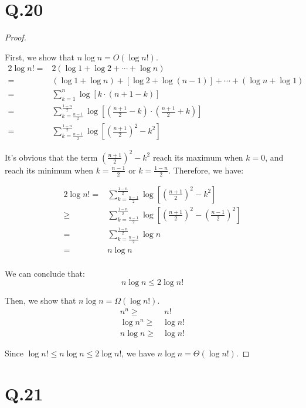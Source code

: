 \documentclass[a4paper,12pt]{article}
\begin{document}
\section*{Q.20}
\begin{proof}
$ $

First, we show that $n \log n = O(\log n!)$.
\begin{align*}
	2 \log n! =& 2(\log 1 + \log 2 + \cdots + \log n)\\
	=& (\log 1 + \log n) + [\log 2 + \log (n-1)] + \cdots + (\log n + \log 1)\\
	=& \sum_{k = 1}^{n} \log [k \cdot (n + 1 - k)]\\
	=& \sum_{k = \frac{n - 1}{2}}^{\frac{1 - n}{2}} \log [(\frac{n + 1}{2} - k) \cdot (\frac{n + 1}{2} + k)]\\
	=& \sum_{k = \frac{n - 1}{2}}^{\frac{1 - n}{2}} \log [(\frac{n + 1}{2})^2 - k^2]
\end{align*}

It's obvious that the term $(\frac{n + 1}{2})^2 - k^2$ reach its maximum when $k = 0$, and reach its minimum when $k = \frac{n - 1}{2}$ or $k = \frac{1 - n}{2}$.
Therefore, we have:

\begin{align*}
	2 \log n! =& \sum_{k = \frac{n - 1}{2}}^{\frac{1 - n}{2}} \log [(\frac{n + 1}{2})^2 - k^2]\\
	\geq& \sum_{k = \frac{n - 1}{2}}^{\frac{1 - n}{2}} \log [(\frac{n + 1}{2})^2 - (\frac{n - 1}{2})^2]\\
	=& \sum_{k = \frac{n - 1}{2}}^{\frac{1 - n}{2}} \log n\\
	=& n \log n\\
\end{align*}

We can conclude that:
\begin{equation*}
	n \log n \leq 2 \log n!
\end{equation*}

Then, we show that $n \log n = \Omega(\log n!)$.
\begin{align*}
	n^n \geq&\ n!\\
	\log n^n \geq& \log n!\\
	n \log n \geq& \log n!
\end{align*}

Since $\log n! \leq n \log n \leq 2 \log n!$, we have $n \log n = \Theta(\log n!)$.
\end{proof}

\section*{Q.21}
\end{document}
